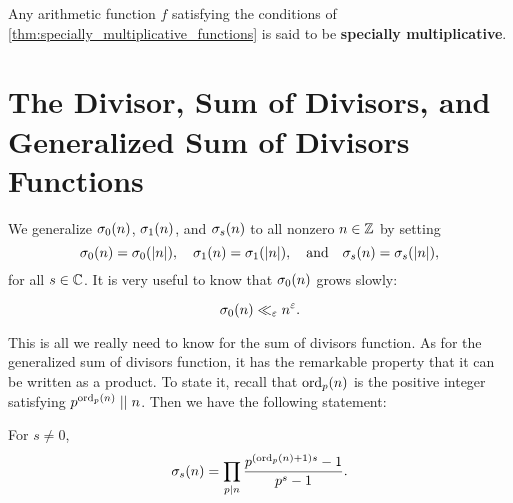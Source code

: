     Any arithmetic function $f$ satisfying the conditions of \cref{thm:specially_multiplicative_functions} is said to be \textbf{specially multiplicative}.
  \section{The Divisor, Sum of Divisors, and Generalized Sum of Divisors Functions}
    We generalize $\sigma_{0}(n)$, $\sigma_{1}(n)$, and $\sigma_{s}(n)$ to all nonzero $n \in \mathbb{Z}$ by setting
    \[
      \sigma_{0}(n) = \sigma_{0}(|n|), \quad \sigma_{1}(n) = \sigma_{1}(|n|), \quad \text{and} \quad \sigma_{s}(n) = \sigma_{s}(|n|),
    \]
    for all $s \in \mathbb{C}$. It is very useful to know that $\sigma_{0}(n)$ grows slowly:

    \begin{proposition}\label{prop:sum_of_divisors_growth_rate}
      \phantom{ }
      \[
        \sigma_{0}(n) \ll_{\varepsilon} n^{\varepsilon}.
      \]
    \end{proposition}

    This is all we really need to know for the sum of divisors function. As for the generalized sum of divisors function, it has the remarkable property that it can be written as a product. To state it, recall that $\operatorname{\mathrm{ord}}_{p}(n)$ is the positive integer satisfying $p^{\operatorname{\mathrm{ord}}_{p}(n)} \mid\mid n$. Then we have the following statement:

    \begin{proposition}\label{prop:generalized_sum_of_divisors_as_product}
      For $s \neq 0$,
      \[
        \sigma_{s}(n) = \prod_{p \mid n}\frac{p^{(\operatorname{\mathrm{ord}}_{p}(n)+1)s}-1}{p^{s}-1}.
      \]
    \end{proposition}
